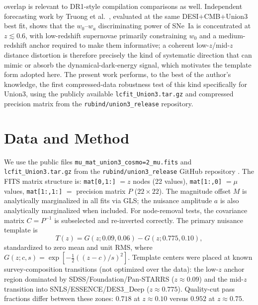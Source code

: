 \documentclass[11pt]{article}
\begin{document}
overlap is relevant to DR1-style compilation comparisons as well. Independent
forecasting work by Truong et al.\ \cite{truong2026}, evaluated at the same
DESI$+$CMB$+$Union3 best fit, shows that the $w_0$--$w_a$ discriminating power of
SNe~Ia is concentrated at $z\lesssim0.6$, with low-redshift supernovae primarily
constraining $w_0$ and a medium-redshift anchor required to make them informative;
a coherent low-$z$/mid-$z$ distance distortion is therefore precisely the kind of
systematic direction that can mimic or absorb the dynamical-dark-energy signal,
which motivates the template form adopted here. The present work
performs, to the best of the author's knowledge, the first compressed-data robustness
test of this kind specifically for Union3, using the publicly available
\texttt{lcfit\_Union3.tar.gz} and compressed precision matrix from the
\texttt{rubind/union3\_release} repository.

\section{Data and Method}

We use the public files \texttt{mu\_mat\_union3\_cosmo=2\_mu.fits} and
\texttt{lcfit\_Union3.tar.gz} from the \texttt{rubind/union3\_release} GitHub
repository \cite{data}. The FITS matrix structure is: \texttt{mat[0,1:]} $=z$ nodes (22 values),
\texttt{mat[1:,0]} $=\mu$ values, \texttt{mat[1:,1:]} $=$ precision matrix $P$
($22\times22$). The magnitude offset $M$ is analytically marginalized in all fits via
GLS; the nuisance amplitude $a$ is also analytically marginalized when included. For
node-removal tests, the covariance matrix $C=P^{-1}$ is subselected and re-inverted
correctly. The primary nuisance template is
\begin{equation}
T(z)=G(z;0.09,0.06)-G(z;0.775,0.10),
\end{equation}
standardized to zero mean and unit RMS, where $G(z;c,s)=\exp[-\tfrac12((z-c)/s)^2]$.
Template centers were placed at known survey-composition transitions (not optimized
over the data): the low-$z$ anchor region dominated by SDSS/Foundation/Pan-STARRS
($z\approx0.09$) and the mid-$z$ transition into SNLS/ESSENCE/DES3\_Deep
($z\approx0.775$). Quality-cut pass fractions differ between these zones: $0.718$ at
$z\approx0.10$ versus $0.952$ at $z\approx0.75$.
\end{document}
